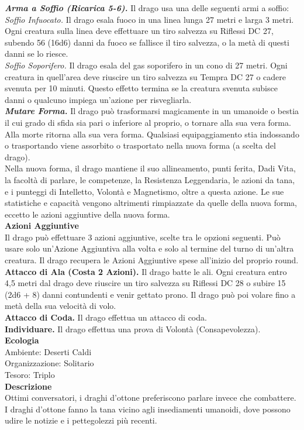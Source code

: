 \begin{multicols}{2}
\emph{\textbf{Arma a Soffio (Ricarica 5-6).}} Il drago usa una delle seguenti armi a soffio:\\
\emph{Soffio Infuocato.} Il drago esala fuoco in una linea lunga 27 metri e larga 3 metri. Ogni creatura sulla linea deve effettuare un tiro salvezza su Riflessi DC  27, subendo 56 (16d6) danni da fuoco se fallisce il tiro salvezza, o la metà di questi danni se lo riesce.\\
\emph{Soffio Soporifero.} Il drago esala del gas soporifero in un cono di 27 metri. Ogni creatura in quell'area deve riuscire un tiro salvezza su Tempra DC  27 o cadere svenuta per 10 minuti. Questo effetto termina se la creatura svenuta subisce danni o qualcuno impiega un'azione per risvegliarla.\\
\emph{\textbf{Mutare Forma.}} Il drago può trasformarsi magicamente in un umanoide o bestia il cui grado di sfida sia pari o inferiore al proprio, o tornare alla sua vera forma. Alla morte ritorna alla sua vera forma. Qualsiasi equipaggiamento stia indossando o trasportando viene assorbito o trasportato nella nuova forma (a scelta del drago). \\
Nella nuova forma, il drago mantiene il suo allineamento, punti ferita, Dadi Vita, la facoltà di parlare, le competenze, la Resistenza Leggendaria, le azioni da tana, e i punteggi di Intelletto, Volontà e Magnetismo, oltre a questa azione. Le sue statistiche e capacità vengono altrimenti rimpiazzate da quelle della nuova forma, eccetto le azioni aggiuntive della nuova forma.\\
\textbf{Azioni Aggiuntive}\\
Il drago può effettuare 3 azioni aggiuntive, scelte tra le opzioni seguenti. Può usare solo un'Azione Aggiuntiva alla volta e solo al termine del turno di un'altra creatura. Il drago recupera le Azioni Aggiuntive spese all'inizio del proprio round.\\
\textbf{Attacco di Ala (Costa 2 Azioni).} Il drago batte le ali. Ogni creatura entro 4,5 metri dal drago deve riuscire un tiro salvezza su Riflessi DC  28 o subire 15 (2d6 + 8) danni contundenti e venir gettato prono. Il drago può poi volare fino a metà della sua velocità di volo.\\
\textbf{Attacco di Coda.} Il drago effettua un attacco di coda.\\
\textbf{Individuare.} Il drago effettua una prova di Volontà (Consapevolezza).\\
\textbf{Ecologia}\\
Ambiente: Deserti Caldi\\
Organizzazione: Solitario\\
Tesoro: Triplo\\
\textbf{Descrizione}\\
Ottimi conversatori, i draghi d’ottone preferiscono parlare invece che combattere. I draghi d’ottone fanno la tana vicino agli insediamenti umanoidi, dove possono udire le notizie e i pettegolezzi più recenti.\\



\end{multicols}
